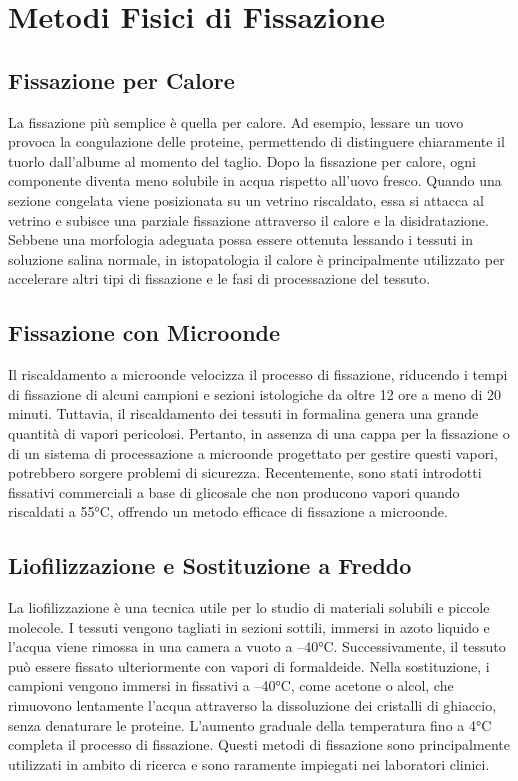 \section{Metodi Fisici di Fissazione}
\subsection{Fissazione per Calore}
La fissazione più semplice è quella per calore. Ad esempio, lessare un uovo provoca la coagulazione delle proteine, permettendo di distinguere chiaramente il tuorlo dall'albume al momento del taglio. Dopo la fissazione per calore, ogni componente diventa meno solubile in acqua rispetto all'uovo fresco. Quando una sezione congelata viene posizionata su un vetrino riscaldato, essa si attacca al vetrino e subisce una parziale fissazione attraverso il calore e la disidratazione. Sebbene una morfologia adeguata possa essere ottenuta lessando i tessuti in soluzione salina normale, in istopatologia il calore è principalmente utilizzato per accelerare altri tipi di fissazione e le fasi di processazione del tessuto.

\subsection{Fissazione con Microonde}
Il riscaldamento a microonde velocizza il processo di fissazione, riducendo i tempi di fissazione di alcuni campioni e sezioni istologiche da oltre 12 ore a meno di 20 minuti. Tuttavia, il riscaldamento dei tessuti in formalina genera una grande quantità di vapori pericolosi. Pertanto, in assenza di una cappa per la fissazione o di un sistema di processazione a microonde progettato per gestire questi vapori, potrebbero sorgere problemi di sicurezza. Recentemente, sono stati introdotti fissativi commerciali a base di glicosale che non producono vapori quando riscaldati a 55°C, offrendo un metodo efficace di fissazione a microonde.

\subsection{Liofilizzazione e Sostituzione a Freddo}
La liofilizzazione è una tecnica utile per lo studio di materiali solubili e piccole molecole. I tessuti vengono tagliati in sezioni sottili, immersi in azoto liquido e l'acqua viene rimossa in una camera a vuoto a --40°C. Successivamente, il tessuto può essere fissato ulteriormente con vapori di formaldeide. Nella sostituzione, i campioni vengono immersi in fissativi a --40°C, come acetone o alcol, che rimuovono lentamente l'acqua attraverso la dissoluzione dei cristalli di ghiaccio, senza denaturare le proteine. L'aumento graduale della temperatura fino a 4°C completa il processo di fissazione. Questi metodi di fissazione sono principalmente utilizzati in ambito di ricerca e sono raramente impiegati nei laboratori clinici.


